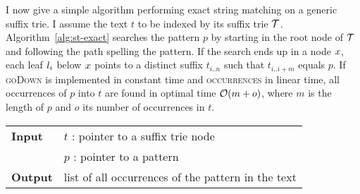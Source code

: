 I now give a simple algorithm performing exact string matching on a generic suffix trie.
I assume the text $t$ to be indexed by its suffix trie $\mathcal {T}$.
Algorithm~\ref{alg:st-exact} searches the pattern $p$ by starting in the root node of $\mathcal {T}$ and following the path spelling the pattern.
If the search ends up in a node $x$, each leaf $l_i$ below $x$ points to a distinct suffix $t_{i..n}$ such that $t_{i..i+m}$ equals $p$.
If \textsc{goDown} is implemented in constant time and \textsc{occurrences} in linear time, all occurrences of $p$ into $t$ are found in optimal time $\mathcal{O}(m+o)$, where $m$ is the length of $p$ and $o$ its number of occurrences in $t$.

\begin{center}
\begin{minipage}[t]{.7\textwidth}
\begin{algorithm}[H]
\begin{tabular}{ll}
\textbf{Input}  & $t$ : pointer to a suffix trie node\\
				& $p$ : pointer to a pattern\\
\textbf{Output} & list of all occurrences of the pattern in the text\\
\end{tabular}
\begin{algorithmic}[1]
	\State \Report {}
		\State {}
\EndIf
\end{algorithmic}
\label{alg:st-exact}
\end{algorithm}
\end{minipage}
\end{center}

%



